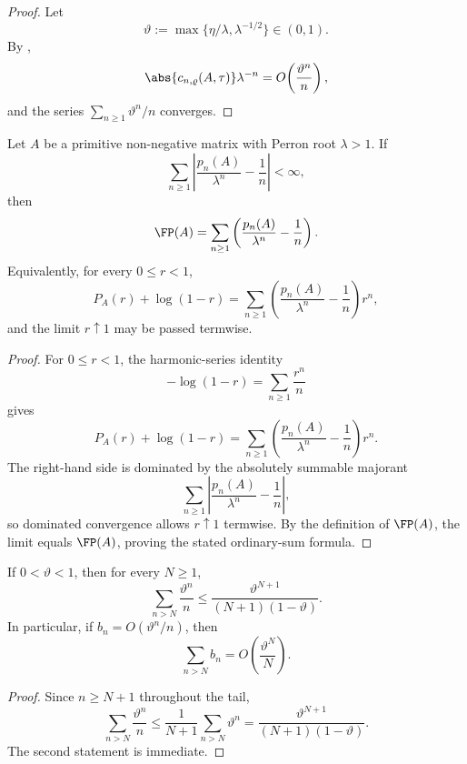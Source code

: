 \begin{proof}
  Let
  \[
    \vartheta:=\max\{\eta/\lambda,\lambda^{-1/2}\}\in(0,1).
  \]
  By ,
  \[
    \abs{c_{n,\varrho}(A,\tau)}\lambda^{-n}
    =O\!\left(\frac{\vartheta^n}{n}\right),
  \]
  and the series \(\sum_{n\ge 1}\vartheta^n/n\) converges.
\end{proof}

\begin{lemma}
  \label{lem:abel-correction-sum}
  Let \(A\) be a primitive non-negative matrix with Perron root
  \(\lambda>1\). If
  \[
    \sum_{n\ge 1}\left|\frac{p_n(A)}{\lambda^n}-\frac{1}{n}\right|
    <\infty,
  \]
  then
  \[
    \FP(A)
    =
    \sum_{n\ge 1}\left(\frac{p_n(A)}{\lambda^n}-\frac{1}{n}\right).
  \]
  Equivalently, for every \(0\le r<1\),
  \[
    P_A(r)+\log(1-r)
    =
    \sum_{n\ge 1}\left(\frac{p_n(A)}{\lambda^n}-\frac{1}{n}\right)r^n,
  \]
  and the limit \(r\uparrow 1\) may be passed termwise.
\end{lemma}

\begin{proof}
  For \(0\le r<1\), the harmonic-series identity
  \[
    -\log(1-r)=\sum_{n\ge 1}\frac{r^n}{n}
  \]
  gives
  \[
    P_A(r)+\log(1-r)
    =
    \sum_{n\ge 1}\left(\frac{p_n(A)}{\lambda^n}-\frac{1}{n}\right)r^n.
  \]
  The right-hand side is dominated by the absolutely summable majorant
  \[
    \sum_{n\ge 1}\left|\frac{p_n(A)}{\lambda^n}-\frac{1}{n}\right|,
  \]
  so dominated convergence allows \(r\uparrow 1\) termwise. By the
  definition of \(\FP(A)\), the limit equals \(\FP(A)\), proving the
  stated ordinary-sum formula.
\end{proof}

\begin{lemma}
  \label{lem:geometric-harmonic-tail}
  If \(0<\vartheta<1\), then for every \(N\ge 1\),
  \[
    \sum_{n>N}\frac{\vartheta^n}{n}
    \le
    \frac{\vartheta^{N+1}}{(N+1)(1-\vartheta)}.
  \]
  In particular, if \(b_n=O(\vartheta^n/n)\), then
  \[
    \sum_{n>N}b_n=O\!\left(\frac{\vartheta^N}{N}\right).
  \]
\end{lemma}

\begin{proof}
  Since \(n\ge N+1\) throughout the tail,
  \[
    \sum_{n>N}\frac{\vartheta^n}{n}
    \le
    \frac{1}{N+1}\sum_{n>N}\vartheta^n
    =
    \frac{\vartheta^{N+1}}{(N+1)(1-\vartheta)}.
  \]
  The second statement is immediate.
\end{proof}

